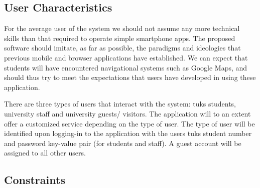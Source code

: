 \documentclass[12pt,a4paper]{article}
\begin{document}

		\subsection{User Characteristics}
			
			\begin{flushleft}
			For the average user of the system we should not assume any more technical
			skills than that required to operate simple smartphone apps. The proposed
			software should imitate, as far as possible, the paradigms and ideologies
			that previous mobile and browser applications have established. We can
			expect that students will have encountered navigational systems such as
			Google Maps, and should thus try to meet the expectations that users have
			developed in using these application.
			\end{flushleft}
		
			\begin{flushleft}
			There are three types of users that interact with the system: tuks students, university staff and 				university guests/ visitors. The application will to an extent offer a customized service depending on 				the type of user. The type of user will be identified upon logging-in to the application with the users 			tuks student number and password key-value pair (for students and staff). A guest account will be 				assigned to all other users.
			\end{flushleft}

		\subsection{Constraints}

			\begin{itemize}


\end{itemize}
\end{document}
\end{itemize}
\end{document}
